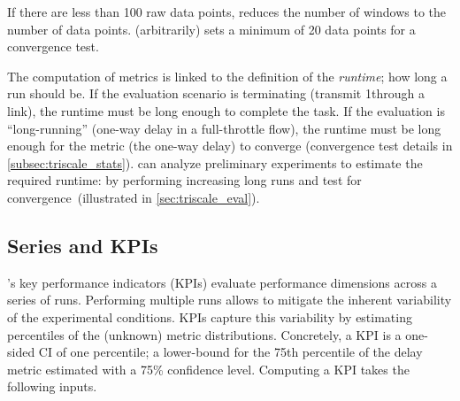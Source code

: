 \begin{remark}
  If there are less than 100 raw data points, \triscale reduces the number of windows to the number of data points.
  \triscale (arbitrarily) sets a minimum of 20 data points for a convergence test.
\end{remark}


The computation of \triscale metrics is linked to the definition of the \emph{runtime}; \ie how long a run should be.
If the evaluation scenario is terminating (\eg transmit 1\MB through a link), the runtime must be long enough to complete the task.
If the evaluation is ``long-running'' (\eg one-way delay in a full-throttle flow), the runtime must be long enough for the metric (the one-way delay) to converge (convergence test details in \cref{subsec:triscale_stats}).
\triscale can analyze preliminary experiments to estimate the required runtime: by performing increasing long runs and test for convergence~(illustrated in \cref{sec:triscale_eval}).

\subsection{Series and KPIs}
\label{subsec:KPIs}

\triscale's key performance indicators (KPIs) evaluate performance dimensions across a series of runs.
Performing multiple runs allows to mitigate the inherent variability of the experimental conditions.
KPIs capture this variability by estimating percentiles of the (unknown) metric distributions.
Concretely, a \triscale KPI is a one-sided CI of one percentile; \eg a lower-bound for the 75th percentile of the delay metric estimated with a 75\% confidence level.
Computing a KPI takes the following inputs.




